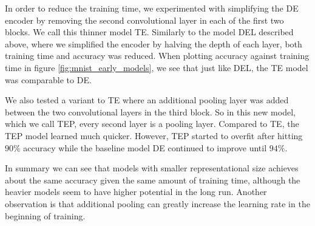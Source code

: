 

In order to reduce the training time, we experimented with
simplifying the DE encoder by removing the second convolutional layer in each of the first two blocks. We call this thinner model TE.
Similarly to the model DEL described above, where we simplified the encoder by halving the depth of each layer, both training time and accuracy was reduced. When plotting accuracy against training time in figure \ref{fig:mnist_early_models}, we see that just like DEL, the TE model was comparable to DE.

We also tested a variant to TE where an additional pooling layer was added between the two convolutional layers in the third block. So in this new model, which we call TEP, every second layer is a pooling layer.
Compared to TE, the TEP model learned much quicker. However, TEP started to overfit after hitting $90\%$ accuracy while the baseline model DE continued to improve until $94\%$.


In summary we can see that models with smaller representational size achieves about the same accuracy given the same amount of training time, although the heavier models seem to have higher potential in the long run. Another observation is that additional pooling can greatly increase the learning rate in the beginning of training.


